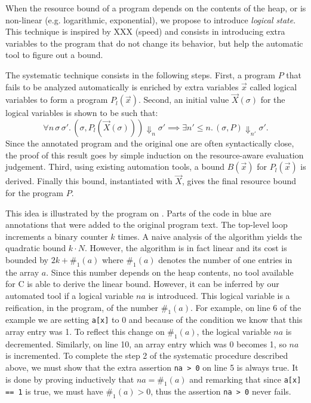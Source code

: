 \documentclass[nocopyrightspace,preprint,pldi]{sigplanconf-pldi15}
\newcommand{\pref}[1]{\prettyref{#1}}
\begin{document}
When the resource bound of a program depends on the contents of the heap,
or is non-linear (e.g. logarithmic, exponential), we propose to
introduce \emph{logical state}.
This technique is inspired by XXX (speed) and consists in introducing
extra variables to the program that do not change its behavior, but help
the automatic tool to figure out a bound.

The systematic technique consists in the following steps. First,
a program $P$ that fails to be analyzed automatically is enriched
by extra variables $\vec x$ called logical variables to form a
program $P_l(\vec x)$.  Second, an initial value $\vec X(\sigma)$
for the logical variables is shown to be such that:
$$
\forall n\, \sigma\, \sigma'.\,
  (\sigma, P_l(\vec X(\sigma))) \Downarrow_n \sigma'
    {\implies}
  \exists n' {\le} n.\,
    (\sigma, P) \Downarrow_{n'} \sigma'.
$$
Since the annotated program and the original one are often
syntactically close, the proof of this result goes
by simple induction on the resource-aware evaluation judgement.
Third, using existing automation tools, a bound $B(\vec x)$ for
$P_l(\vec x)$ is derived.  Finally this bound, instantiated with
$\vec X$, gives the final resource bound for the program $P$.

This idea is illustrated by the program on \pref{fig:xmplincaux}.
Parts of the code in blue are annotations that were added
to the original program text.  The top-level loop increments
a binary counter $k$ times.  A naive analysis of
the algorithm yields the quadratic bound $k \cdot N$.
However, the algorithm is in fact linear and its cost is bounded
by $2k + \#_1(a)$ where $\#_1(a)$ denotes
the number of one entries in the array $a$.  Since this
number depends on the heap contents, no tool available
for C is able to derive the linear bound.  However, it can be inferred
by our automated tool if a logical variable $na$ is introduced.
This logical variable is a reification, in the program, of the
number $\#_1(a)$.  For example, on line 6 of the example
we are setting \lstinline{a[x]} to 0 and because of the condition we
know that this array entry was 1.  To reflect this change on
$\#_1(a)$, the logical variable $na$ is decremented.
Similarly, on line 10, an array entry which was 0 becomes 1, so
$na$ is incremented.  To complete the step 2 of the systematic
procedure described above, we must show that the extra assertion
\lstinline{na > 0} on line 5 is always true.  It
is done by proving inductively that $na = \#_1(a)$
and remarking that since \lstinline{a[x] == 1} is true, we must have
$\#_1(a) > 0$, thus the assertion \lstinline{na > 0} never fails. %
\end{document}
